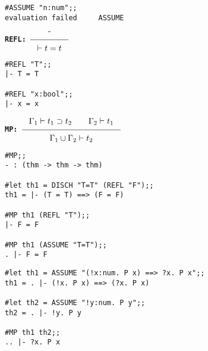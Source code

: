 \vskip 4mm
\begin{session}\begin{verbatim}
#ASSUME "n:num";;
evaluation failed     ASSUME
\end{verbatim}\end{session}



\vskip10mm
\bspindent\LARGE\bf
{\Large\tt REFL:\quad}
$\Rule{\mbox{-}}{\vdash t=t}$
\espindent

\vskip 7mm
\vskip 4mm
\begin{session}\begin{verbatim}
#REFL "T";;
|- T = T

#REFL "x:bool";;
|- x = x
\end{verbatim}\end{session}



\vskip10mm
\bspindent\LARGE\bf
{\Large\tt MP:\quad} 
$\Rule{\Gamma_1 \vdash t_1 \supset t_2 \qquad \Gamma_2 \vdash t_1}
{\Gamma_1 \cup \Gamma_2 \vdash t_2}$
\espindent

\vskip 7mm
\vskip5mm

\vskip 7mm
\vskip 4mm
\begin{session}\begin{verbatim}
#MP;;
- : (thm -> thm -> thm)

#let th1 = DISCH "T=T" (REFL "F");;
th1 = |- (T = T) ==> (F = F)

#MP th1 (REFL "T");;
|- F = F

#MP th1 (ASSUME "T=T");;
. |- F = F
\end{verbatim}\end{session}




\vskip 4mm
\begin{session}\begin{verbatim}
#let th1 = ASSUME "(!x:num. P x) ==> ?x. P x";;
th1 = . |- (!x. P x) ==> (?x. P x)

#let th2 = ASSUME "!y:num. P y";;
th2 = . |- !y. P y

#MP th1 th2;;
.. |- ?x. P x
\end{verbatim}\end{session}

